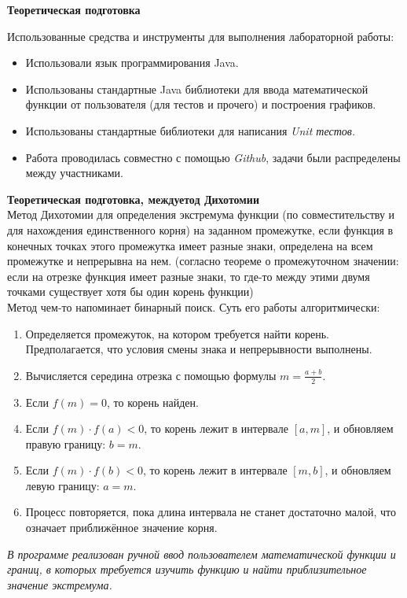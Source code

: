 \textbf{Теоретическая подготовка}
\vspace{0.5cm}

Использованные средства и инструменты для выполнения лабораторной работы:
\begin{itemize}
    \item Использовали язык программирования Java.
    \item Использованы стандартные Java библиотеки для ввода математической функции от пользователя (для тестов и прочего) и построения графиков.
    \item Использованы стандартные библиотеки для написания \textit{Unit тестов.}
    \item Работа проводилась совместно с помощью \textit{Github}, задачи были распределены между участниками.
\end{itemize}
\vspace{1cm}

\textbf{Теоретическая подготовка, междуетод Дихотомии}\\

Метод Дихотомии для определения экстремума функции (по совместительству и для нахождения единственного корня)
на заданном промежутке, если функция в конечных точках этого промежутка имеет разные знаки, определена на всем промежутке и непрерывна 
на нем. (согласно теореме о промежуточном значении: если на отрезке функция имеет разные знаки, то где-то между
этими двумя точками существует хотя бы один корень функции)\\

Метод чем-то напоминает бинарный поиск. Суть его работы алгоритмически:
\begin{enumerate}
    \item Определяется промежуток, на котором требуется найти корень. Предполагается, что условия смены знака и непрерывности выполнены.
    \item Вычисляется середина отрезка с помощью формулы \( m = \frac{a + b}{2} \). 
    \item Если \( f(m) = 0 \), то корень найден. 
    \item Если \( f(m) \cdot f(a) < 0 \), то корень лежит в интервале \([a, m]\), и обновляем правую границу: \(b = m\).
    \item Если \( f(m) \cdot f(b) < 0 \), то корень лежит в интервале \([m, b]\), и обновляем левую границу: \(a = m\).
    \item Процесс повторяется, пока длина интервала не станет достаточно малой, что означает приближённое значение корня.
\end{enumerate}
\textit{В программе реализован ручной ввод пользователем математической функции и границ, в которых требуется изучить функцию и найти приблизительное значение экстремума.}
